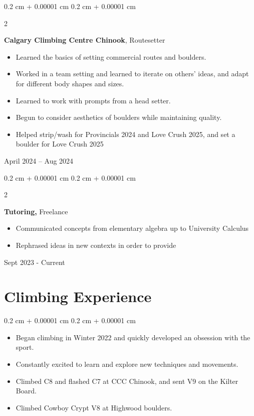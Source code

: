 \documentclass[10pt, letterpaper]{article}
\newenvironment{highlights}{
    \begin{itemize}[
        topsep=0.10 cm,
        parsep=0.10 cm,
        partopsep=0pt,
        itemsep=0pt,
        leftmargin=0.4 cm + 10pt
    ]
}{
    \end{itemize}
} %
\newenvironment{onecolentry}{
    \begin{adjustwidth}{
        0.2 cm + 0.00001 cm
    }{
        0.2 cm + 0.00001 cm
    }
}{
    \end{adjustwidth}
} %
\newenvironment{twocolentry}[2][]{
    \onecolentry
    \def\secondColumn{#2}
    \setcolumnwidth{\fill, 4.5 cm}
    \begin{paracol}{2}
}{
    \switchcolumn \raggedleft \secondColumn
    \end{paracol}
    \endonecolentry
} %
\begin{document}
        \begin{twocolentry}{
        April 2024 – Aug 2024
        }
            \textbf{Calgary Climbing Centre Chinook}, Routesetter
            \begin{highlights}
                \item Learned the basics of setting commercial routes and boulders.
                \item Worked in a team setting and learned to iterate on others' ideas, and adapt for different body shapes and sizes.
                \item Learned to work with prompts from a head setter.
                \item Begun to consider aesthetics of boulders while maintaining quality.
                \item Helped strip/wash for Provincials 2024 and Love Crush 2025, and set a boulder for Love Crush 2025
            \end{highlights}
        \end{twocolentry}
        \begin{twocolentry}{
                Sept 2023 - Current
            }
            \textbf{Tutoring, }Freelance
            \begin{highlights}
            \item Communicated concepts from elementary algebra up to University Calculus
            \item Rephrased ideas in new contexts in order to provide
            \end{highlights}
        \end{twocolentry}
    
    \section{Climbing Experience}
    \begin{onecolentry}
        \begin{highlights}
            \item Began climbing in Winter 2022 and quickly developed an obsession with the sport.
            \item Constantly excited to learn and explore new techniques and movements.
            \item Climbed C8 and flashed C7 at CCC Chinook, and sent V9 on the Kilter Board.
            \item Climbed Cowboy Crypt V8 at Highwood boulders.
        \end{highlights}
    \end{onecolentry}
        
\end{document}
